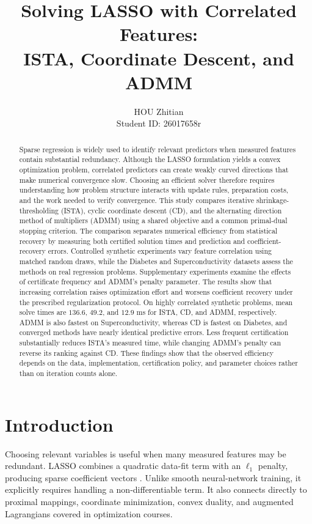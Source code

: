 \documentclass{article}
\title{Solving LASSO with Correlated Features:\\ISTA, Coordinate Descent, and ADMM}
\author{HOU Zhitian\\Student ID: 26017658r}
\begin{document}
\maketitle
\begin{abstract}
Sparse regression is widely used to identify relevant predictors when measured features contain substantial redundancy. Although the LASSO formulation yields a convex optimization problem, correlated predictors can create weakly curved directions that make numerical convergence slow. Choosing an efficient solver therefore requires understanding how problem structure interacts with update rules, preparation costs, and the work needed to verify convergence. This study compares iterative shrinkage-thresholding (ISTA), cyclic coordinate descent (CD), and the alternating direction method of multipliers (ADMM) using a shared objective and a common primal-dual stopping criterion. The comparison separates numerical efficiency from statistical recovery by measuring both certified solution times and prediction and coefficient-recovery errors. Controlled synthetic experiments vary feature correlation using matched random draws, while the Diabetes and Superconductivity datasets assess the methods on real regression problems. Supplementary experiments examine the effects of certificate frequency and ADMM's penalty parameter. The results show that increasing correlation raises optimization effort and worsens coefficient recovery under the prescribed regularization protocol. On highly correlated synthetic problems, mean solve times are $136.6$, $49.2$, and $12.9$ ms for ISTA, CD, and ADMM, respectively. ADMM is also fastest on Superconductivity, whereas CD is fastest on Diabetes, and converged methods have nearly identical predictive errors. Less frequent certification substantially reduces ISTA's measured time, while changing ADMM's penalty can reverse its ranking against CD. These findings show that the observed efficiency depends on the data, implementation, certification policy, and parameter choices rather than on iteration counts alone.
\end{abstract}


\section{Introduction}
Choosing relevant variables is useful when many measured features may be redundant. LASSO combines a quadratic data-fit term with an $\ell_1$ penalty, producing sparse coefficient vectors \citep{tibshirani1996}. Unlike smooth neural-network training, it explicitly requires handling a non-differentiable term. It also connects directly to proximal mappings, coordinate minimization, convex duality, and augmented Lagrangians covered in optimization courses.
\end{document}
